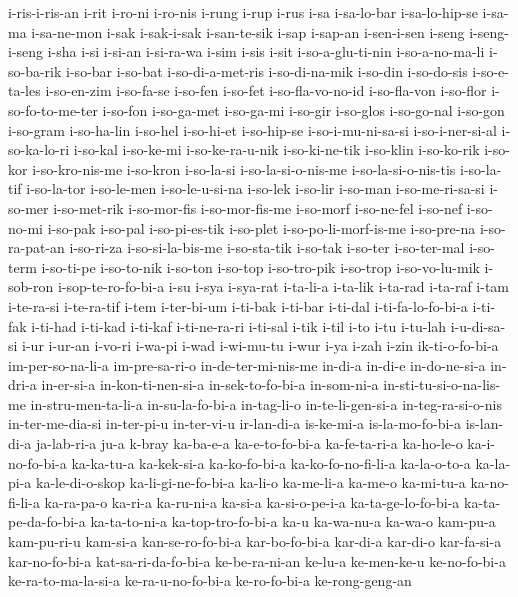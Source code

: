 {i-ris-i-ris-an i-rit i-ro-ni i-ro-nis i-rung i-rup i-rus i-sa i-sa-lo-bar
i-sa-lo-hip-se i-sa-ma i-sa-ne-mon i-sak i-sak-i-sak i-san-te-sik i-sap
i-sap-an i-sen-i-sen i-seng i-seng-i-seng i-sha i-si i-si-an i-si-ra-wa
i-sim i-sis i-sit i-so-a-glu-ti-nin i-so-a-no-ma-li i-so-ba-rik i-so-bar
i-so-bat i-so-di-a-met-ris i-so-di-na-mik i-so-din i-so-do-sis
i-so-e-ta-les i-so-en-zim i-so-fa-se i-so-fen i-so-fet i-so-fla-vo-no-id
i-so-fla-von i-so-flor i-so-fo-to-me-ter i-so-fon i-so-ga-met i-so-ga-mi
i-so-gir i-so-glos i-so-go-nal i-so-gon i-so-gram i-so-ha-lin i-so-hel
i-so-hi-et i-so-hip-se i-so-i-mu-ni-sa-si i-so-i-ner-si-al i-so-ka-lo-ri
i-so-kal i-so-ke-mi i-so-ke-ra-u-nik i-so-ki-ne-tik i-so-klin i-so-ko-rik
i-so-kor i-so-kro-nis-me i-so-kron i-so-la-si i-so-la-si-o-nis-me
i-so-la-si-o-nis-tis i-so-la-tif i-so-la-tor i-so-le-men i-so-le-u-si-na
i-so-lek i-so-lir i-so-man i-so-me-ri-sa-si i-so-mer i-so-met-rik
i-so-mor-fis i-so-mor-fis-me i-so-morf i-so-ne-fel i-so-nef i-so-no-mi
i-so-pak i-so-pal i-so-pi-es-tik i-so-plet i-so-po-li-morf-is-me
i-so-pre-na i-so-ra-pat-an i-so-ri-za i-so-si-la-bis-me i-so-sta-tik
i-so-tak i-so-ter i-so-ter-mal i-so-term i-so-ti-pe i-so-to-nik i-so-ton
i-so-top i-so-tro-pik i-so-trop i-so-vo-lu-mik i-sob-ron
i-sop-te-ro-fo-bi-a i-su i-sya i-sya-rat i-ta-li-a i-ta-lik i-ta-rad
i-ta-raf i-tam i-te-ra-si i-te-ra-tif i-tem i-ter-bi-um i-ti-bak i-ti-bar
i-ti-dal i-ti-fa-lo-fo-bi-a i-ti-fak i-ti-had i-ti-kad i-ti-kaf
i-ti-ne-ra-ri i-ti-sal i-tik i-til i-to i-tu i-tu-lah i-u-di-sa-si i-ur
i-ur-an i-vo-ri i-wa-pi i-wad i-wi-mu-tu i-wur i-ya i-zah i-zin
ik-ti-o-fo-bi-a im-per-so-na-li-a im-pre-sa-ri-o in-de-ter-mi-nis-me
in-di-a in-di-e in-do-ne-si-a in-dri-a in-er-si-a in-kon-ti-nen-si-a
in-sek-to-fo-bi-a in-som-ni-a in-sti-tu-si-o-na-lis-me in-stru-men-ta-li-a
in-su-la-fo-bi-a in-tag-li-o in-te-li-gen-si-a in-teg-ra-si-o-nis
in-ter-me-dia-si in-ter-pi-u in-ter-vi-u ir-lan-di-a is-ke-mi-a
is-la-mo-fo-bi-a is-lan-di-a ja-lab-ri-a ju-a k-bray ka-ba-e-a
ka-e-to-fo-bi-a ka-fe-ta-ri-a ka-ho-le-o ka-i-no-fo-bi-a ka-ka-tu-a
ka-kek-si-a ka-ko-fo-bi-a ka-ko-fo-no-fi-li-a ka-la-o-to-a ka-la-pi-a
ka-le-di-o-skop ka-li-gi-ne-fo-bi-a ka-li-o ka-me-li-a ka-me-o ka-mi-tu-a
ka-no-fi-li-a ka-ra-pa-o ka-ri-a ka-ru-ni-a ka-si-a ka-si-o-pe-i-a
ka-ta-ge-lo-fo-bi-a ka-ta-pe-da-fo-bi-a ka-ta-to-ni-a ka-top-tro-fo-bi-a
ka-u ka-wa-nu-a ka-wa-o kam-pu-a kam-pu-ri-u kam-si-a kan-se-ro-fo-bi-a
kar-bo-fo-bi-a kar-di-a kar-di-o kar-fa-si-a kar-no-fo-bi-a
kat-sa-ri-da-fo-bi-a ke-be-ra-ni-an ke-lu-a ke-men-ke-u ke-no-fo-bi-a
ke-ra-to-ma-la-si-a ke-ra-u-no-fo-bi-a ke-ro-fo-bi-a ke-rong-geng-an
}
